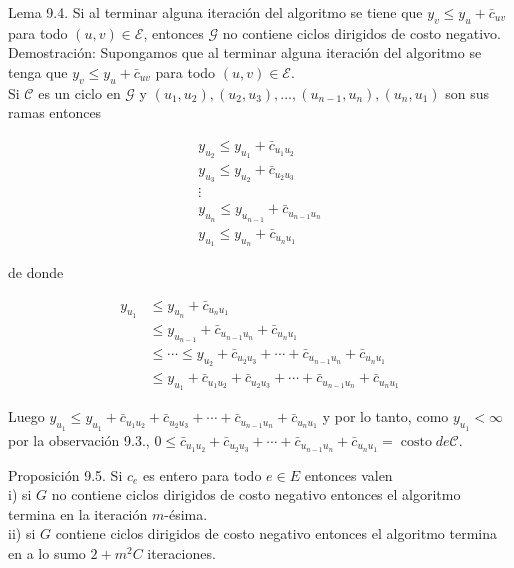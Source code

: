 \documentclass[10pt]{article}
\begin{document}
Lema 9.4. Si al terminar alguna iteración del algoritmo se tiene que $y_{v} \leq y_{u}+\bar{c}_{u v}$ para todo $(u, v) \in \mathcal{E}$, entonces $\mathcal{G}$ no contiene ciclos dirigidos de costo negativo.\\
Demostración: Supongamos que al terminar alguna iteración del algoritmo se tenga que $y_{v} \leq y_{u}+\bar{c}_{u v}$ para todo $(u, v) \in \mathcal{E}$.\\
Si $\mathcal{C}$ es un ciclo en $\mathcal{G}$ y $\left(u_{1}, u_{2}\right),\left(u_{2}, u_{3}\right), \ldots,\left(u_{n-1}, u_{n}\right),\left(u_{n}, u_{1}\right)$ son sus ramas entonces

$$
\begin{gathered}
y_{u_{2}} \leq y_{u_{1}}+\bar{c}_{u_{1} u_{2}} \\
y_{u_{3}} \leq y_{u_{2}}+\bar{c}_{u_{2} u_{3}} \\
\vdots \\
y_{u_{n}} \leq y_{u_{n-1}}+\bar{c}_{u_{n-1} u_{n}} \\
y_{u_{1}} \leq y_{u_{n}}+\bar{c}_{u_{n} u_{1}}
\end{gathered}
$$

de donde

$$
\begin{aligned}
y_{u_{1}} & \leq y_{u_{n}}+\bar{c}_{u_{n} u_{1}} \\
& \leq y_{u_{n-1}}+\bar{c}_{u_{n-1} u_{n}}+\bar{c}_{u_{n} u_{1}} \\
& \leq \cdots \leq y_{u_{2}}+\bar{c}_{u_{2} u_{3}}+\cdots+\bar{c}_{u_{n-1} u_{n}}+\bar{c}_{u_{n} u_{1}} \\
& \leq y_{u_{1}}+\bar{c}_{u_{1} u_{2}}+\bar{c}_{u_{2} u_{3}}+\cdots+\bar{c}_{u_{n-1} u_{n}}+\bar{c}_{u_{n} u_{1}}
\end{aligned}
$$

Luego $y_{u_{1}} \leq y_{u_{1}}+\bar{c}_{u_{1} u_{2}}+\bar{c}_{u_{2} u_{3}}+\cdots+\bar{c}_{u_{n-1} u_{n}}+\bar{c}_{u_{n} u_{1}}$ y por lo tanto, como $y_{u_{1}}<\infty$ por la observación 9.3., $0 \leq \bar{c}_{u_{1} u_{2}}+\bar{c}_{u_{2} u_{3}}+\cdots+\bar{c}_{u_{n-1} u_{n}}+\bar{c}_{u_{n} u_{1}}=\operatorname{costo} d e \mathcal{C}$.

Proposición 9.5. Si $c_{e}$ es entero para todo $e \in E$ entonces valen\\
i) si $G$ no contiene ciclos dirigidos de costo negativo entonces el algoritmo termina en la iteración $m$-ésima.\\
ii) si $G$ contiene ciclos dirigidos de costo negativo entonces el algoritmo termina en a lo sumo $2+m^{2} C$ iteraciones.
\end{document}
